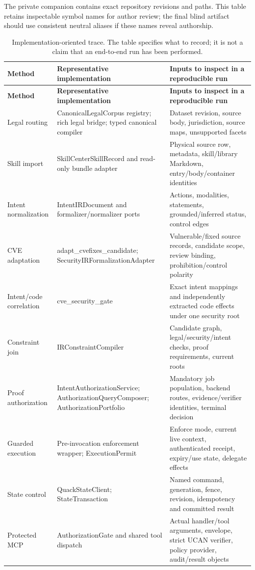 \documentclass{article}
\begin{document}
The private companion contains exact repository revisions and paths. This table retains inspectable symbol names for author review; the final blind artifact should use consistent neutral aliases if these names reveal authorship.
\begingroup
\renewcommand{\thetable}{D1}
\begin{longtable}{@{}>{\raggedright\arraybackslash}p{.24\linewidth} >{\raggedright\arraybackslash}p{.32\linewidth} >{\raggedright\arraybackslash}p{.38\linewidth}@{}}
\caption{Implementation-oriented trace. The table specifies what to record; it is not a claim that an end-to-end run has been performed.}\label{tab:D1}\\
\toprule
\textbf{Method} & \textbf{Representative implementation} & \textbf{Inputs to inspect in a reproducible run} \\
\midrule
\endfirsthead
\textbf{Method} & \textbf{Representative implementation} & \textbf{Inputs to inspect in a reproducible run} \\
\midrule
\endhead
\bottomrule
\endlastfoot
Legal routing & CanonicalLegalCorpus registry; rich legal bridge; typed canonical compiler & Dataset revision, source body, jurisdiction, source maps, unsupported facets \\[3pt]
Skill import & SkillCenterSkillRecord and read-only bundle adapter & Physical source row, metadata, skill/library Markdown, entry/body/container identities \\[3pt]
Intent normalization & IntentIRDocument and formalizer/normalizer ports & Actions, modalities, statements, grounded/inferred status, control edges \\[3pt]
CVE adaptation & adapt\_\allowbreak{}cvefixes\_\allowbreak{}candidate; SecurityIRFormalizationAdapter & Vulnerable/fixed source records, candidate scope, review binding, prohibition/control polarity \\[3pt]
Intent/code correlation & cve\_\allowbreak{}security\_\allowbreak{}gate & Exact intent mappings and independently extracted code effects under one security root \\[3pt]
Constraint join & IRConstraintCompiler & Candidate graph, legal/security/intent checks, proof requirements, current roots \\[3pt]
Proof authorization & IntentAuthorizationService; AuthorizationQueryComposer; AuthorizationPortfolio & Mandatory job population, backend routes, evidence/verifier identities, terminal decision \\[3pt]
Guarded execution & Pre-invocation enforcement wrapper; ExecutionPermit & Enforce mode, current live context, authenticated receipt, expiry/use state, delegate effects \\[3pt]
State control & QuackStateClient; StateTransaction & Named command, generation, fence, revision, idempotency and committed result \\[3pt]
Protected MCP & AuthorizationGate and shared tool dispatch & Actual handler/tool arguments, envelope, strict UCAN verifier, policy provider, audit/result objects \\[3pt]
\end{longtable}
\endgroup
\end{document}

